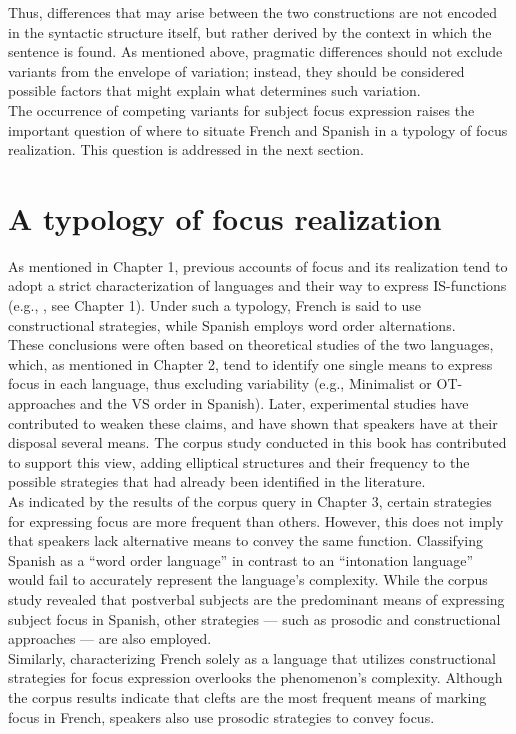 Thus, differences that may arise between the two constructions are not encoded in the syntactic structure itself, but rather derived by the context in which the sentence is found. As mentioned above, pragmatic differences should not exclude variants from the envelope of variation; instead, they should be considered possible factors that might explain what determines such variation.\\
The occurrence of competing variants for subject focus expression raises the important question of where to situate French and Spanish in a typology of focus realization. This question is addressed in the next section.

\section{A typology of focus realization}
As mentioned in Chapter 1, previous accounts of focus and its realization tend to adopt a strict characterization of languages and their way to express IS-functions (e.g., \cite{lambrecht1996information}, see Chapter 1). Under such a typology, French is said to use constructional strategies, while Spanish employs word order alternations. \\
These conclusions were often based on theoretical studies of the two languages, which, as mentioned in Chapter 2, tend to identify one single means to express focus in each language, thus excluding variability (e.g., Minimalist or OT-approaches and the VS order in Spanish). Later, experimental studies have contributed to weaken these claims, and have shown that speakers have at their disposal several means. The corpus study conducted in this book has contributed to support this view, adding elliptical structures and their frequency to the possible strategies that had already been identified in the literature. \\
As indicated by the results of the corpus query in Chapter 3, certain strategies for expressing focus are more frequent than others. However, this does not imply that speakers lack alternative means to convey the same function. Classifying Spanish as a ``word order language” in contrast to an ``intonation language” would fail to accurately represent the language's complexity. While the corpus study revealed that postverbal subjects are the predominant means of expressing subject focus in Spanish, other strategies — such as prosodic and constructional approaches — are also employed. \\
Similarly, characterizing French solely as a language that utilizes constructional strategies for focus expression overlooks the phenomenon's complexity. Although the corpus results indicate that clefts are the most frequent means of marking focus in French, speakers also use prosodic strategies to convey focus.
